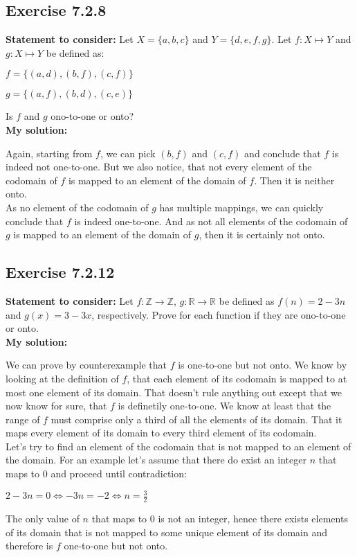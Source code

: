 \documentclass{report}
\newcommand{\cent}[1]{\begin{center}#1\end{center}}
\newcommand{\doubleR}{\mathbb{R}}
\newcommand{\doubleZ}{\mathbb{Z}}
\newcommand{\assignmentDescription}{\textbf{Statement to consider: }}
\newcommand{\solution}{\textbf{My solution: }}
\newcommand{\Exercise}[1]{\subsection{Exercise #1}}
\begin{document}
 	\Exercise{7.2.8}
 	
 	\assignmentDescription
 	Let $X = \{a,b,c\}$ and $Y = \{d,e,f,g\}$. Let $f : X \mapsto Y$ and $g : X \mapsto Y$ be defined as:
 	
 	\cent{$f = \{(a,d),(b,f),(c,f)\}$}
 	\cent{$g = \{(a,f),(b,d),(c,e)\}$}
 	
 	Is $f$ and $g$ ono-to-one or onto?\\
 	
 	\solution
 	
 	Again, starting from $f$, we can pick $(b,f)$ and $(c,f)$ and conclude that $f$ is indeed not one-to-one. But we also notice, that not every element of the codomain of $f$ is mapped to an element of the domain of $f$. Then it is neither onto.\\
 	
 	As no element of the codomain of $g$ has multiple mappings, we can quickly conclude that $f$ is indeed one-to-one. And as not all elements of the codomain of $g$ is mapped to an element of the domain of $g$, then it is certainly not onto.
 	
 	\Exercise{7.2.12}
 	
 	\assignmentDescription
 	Let $f : \doubleZ \to \doubleZ$, $g : \doubleR \to \doubleR $ be defined as $f(n) = 2-3n$ and $g(x) = 3-3x$, respectively. Prove for each function if they are ono-to-one or onto.\\
 	
 	\solution
 	
 	We can prove by counterexample that $f$ is one-to-one but not onto. We know by looking at the definition of $f$, that each element of its codomain is mapped to at most one element of its domain. That doesn't rule anything out except that we now know for sure, that $f$ is definetily one-to-one. We know at least that the range of $f$ must comprise only a third of all the elements of its domain. That it maps every element of its domain to every third element of its codomain.\\
 	
 	Let's try to find an element of the codomain that is not mapped to an element of the domain. For an example let's assume that there do exist an integer $n$ that maps to 0 and proceed until contradiction:
 	
 	\cent{$2-3n=0 \Leftrightarrow -3n=-2 \Leftrightarrow n = \frac{3}{2}$}
 	
 	The only value of $n$ that maps to 0 is not an integer, hence there exists elements of its domain that is not mapped to some unique element of its domain and therefore is $f$ one-to-one but not onto.\\
 	
\end{document}
